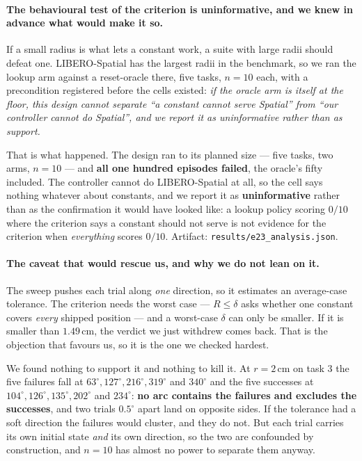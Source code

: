 \documentclass[10pt,twocolumn]{article}
\begin{document}
\paragraph{The behavioural test of the criterion is uninformative, and we
knew in advance what would make it so.} If a small radius is what lets a
constant work, a suite with large radii should defeat one. LIBERO-Spatial has
the largest radii in the benchmark, so we ran the lookup arm against a
reset-oracle there, five tasks, $n{=}10$ each, with a precondition registered
before the cells existed: \emph{if the oracle arm is itself at the floor, this
design cannot separate ``a constant cannot serve Spatial'' from ``our
controller cannot do Spatial'', and we report it as uninformative rather than
as support.}

That is what happened. The design ran to its planned size --- five tasks, two
arms, $n{=}10$ --- and \textbf{all one hundred episodes failed}, the oracle's
fifty included. The controller cannot do LIBERO-Spatial at all, so the cell
says nothing whatever about constants, and we report it as
\textbf{uninformative} rather than as the confirmation it would have looked
like: a lookup policy scoring $0/10$ where the criterion says a constant should
not serve is not evidence for the criterion when \emph{everything} scores
$0/10$. Artifact: \texttt{results/e23\_analysis.json}.

\paragraph{The caveat that would rescue us, and why we do not lean on it.}
The sweep pushes each trial along \emph{one} direction, so it estimates an
average-case tolerance. The criterion needs the worst case --- $R \le \delta$
asks whether one constant covers \emph{every} shipped position --- and a
worst-case $\delta$ can only be smaller. If it is smaller than $1.49$\,cm, the
verdict we just withdrew comes back. That is the objection that favours us, so
it is the one we checked hardest.

We found nothing to support it and nothing to kill it. At $r = 2$\,cm on task
$3$ the five failures fall at $63^\circ, 127^\circ, 216^\circ, 319^\circ$ and
$340^\circ$ and the five successes at $104^\circ, 126^\circ, 135^\circ,
202^\circ$ and $234^\circ$: \textbf{no arc contains the failures and excludes
the successes}, and two trials $0.5^\circ$ apart land on opposite sides. If the
tolerance had a soft direction the failures would cluster, and they do not. But
each trial carries its own initial state \emph{and} its own direction, so the
two are confounded by construction, and $n{=}10$ has almost no power to
separate them anyway.
\end{document}
